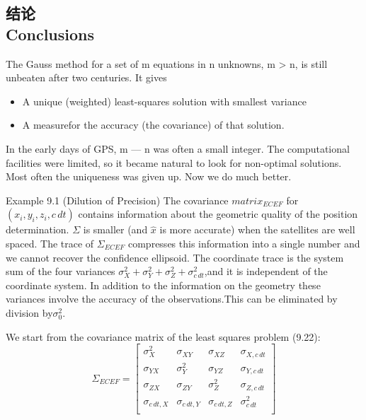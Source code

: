 	\subsection[结论]{结论\\Conclusions}
		The Gauss method for a set of m equations in n unknowns, m > n, is still unbeaten after two centuries. It gives
		\begin{itemize}
			\item A unique (weighted) least-squares solution with smallest variance
			\item A measurefor the accuracy (the covariance) of that solution.
		\end{itemize}
			
		In the early days of GPS, m — n was often a small integer. The computational facilities were limited, so it became natural to look for non-optimal solutions. Most often the uniqueness was given up. Now we do much better.
		
		Example 9.1 (Dilution of Precision) The covariance $matrix_{ECEF}$ for $(x_i,y_i,z_i,c\,dt)$ contains information about the geometric quality of the position determination. $\Sigma$ is smaller (and $\hat{x}$ is more accurate) when the satellites are well spaced. The trace of $\Sigma_{ECEF}$ compresses this information into a single number and we cannot recover the confidence ellipsoid. The coordinate trace is the system sum of the four variances $\sigma^2_X+\sigma^2_Y+\sigma^2_Z+\sigma^2_{c\,dt}$,and it is independent of the coordinate system. In addition to the information on the geometry these variances involve the accuracy of the observations.This can be eliminated by division by$\sigma^2_0$.
			
		We start from the covariance matrix of the least squares problem (9.22):
		\begin{equation}\label{eq:9.27}
			\Sigma_{ECEF} = 
			\begin{bmatrix}
				\sigma^2_X & \sigma_{XY} & \sigma_{XZ} & \sigma_{X,c\,dt} \\
				\sigma_{YX}& \sigma^2_Y  & \sigma_{YZ} & \sigma_{Y,c\,dt} \\
				\sigma_{ZX}& \sigma_{ZY} & \sigma^2_Z & \sigma_{Z,c\,dt} \\
				\sigma_{c\,dt,X} & \sigma_{c\,dt,Y} & \sigma_{c\,dt,Z} & \sigma^2_{c\,dt} \\
			\end{bmatrix}
		\end{equation}
		
